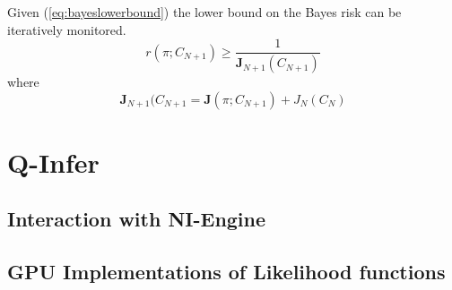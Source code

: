 Given (\ref{eq:bayeslowerbound}) the lower bound on the Bayes risk can be iteratively monitored. 
\begin{equation}
r(\pi;C_{N+1})\geq \frac{1}{\mathbf{J}_{N+1}(C_{N+1})}
\end{equation}
where 
\begin{equation}
\mathbf{J}_{N+1}(C_{N+1} = \mathbf{J}(\pi;C_{N+1})+ J_N(C_N)
\label{eq:riskiteration}
\end{equation}
\section{Q-Infer}
\subsection{Interaction with NI-Engine}
\subsection{GPU Implementations of Likelihood functions}